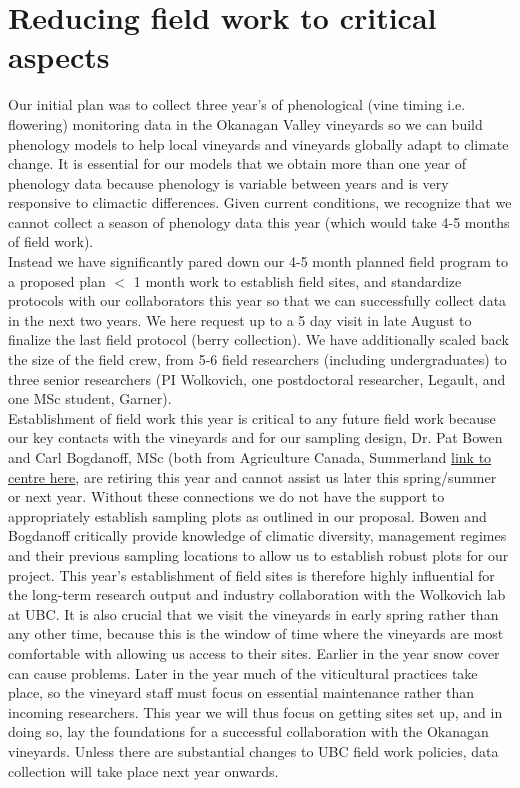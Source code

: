 \documentclass[11pt,letter]{article}
\begin{document}
\section{Reducing field work to critical aspects}
Our initial plan was to collect three year's of phenological (vine timing i.e. flowering) monitoring data in the Okanagan Valley vineyards so we can build phenology models to help local vineyards and vineyards globally adapt to climate change. It is essential for our models that we obtain more than one year of phenology data because phenology is variable between years and is very responsive to climactic differences. Given current conditions, we recognize that we cannot collect a season of phenology data this year (which would take 4-5 months of field work).\\ 

Instead we have significantly pared down our 4-5 month planned field program to a proposed plan $<$ 1 month work to establish field sites, and standardize protocols with our collaborators this year so that we can successfully collect data in the next two years. We here request up to a 5 day visit in late August to finalize the last field protocol (berry collection). We have additionally scaled back the size of the field crew, from 5-6 field researchers (including undergraduates) to three senior researchers (PI Wolkovich, one postdoctoral researcher, Legault, and one MSc student, Garner).\\

Establishment of field work this year is critical to any future field work because our key contacts with the vineyards and for our sampling design, Dr. Pat Bowen and Carl Bogdanoff, MSc (both from Agriculture Canada, Summerland \href{https://profils-profiles.science.gc.ca/en/research-centre/summerland-research-and-development-centre}{link to centre here}, are retiring this year and cannot assist us later this spring/summer or next year. Without these connections we do not have the support to appropriately establish sampling plots as outlined in our proposal. Bowen and Bogdanoff critically provide knowledge of climatic diversity, management regimes and their previous sampling locations to allow us to establish robust plots for our project. This year's establishment of field sites is therefore highly influential for the long-term research output and industry collaboration with the Wolkovich lab at UBC. It is also crucial that we visit the vineyards in early spring rather than any other time, because this is the window of time where the vineyards are most comfortable with allowing us access to their sites. Earlier in the year snow cover can cause problems. Later in the year much of the viticultural practices take place, so the vineyard staff must focus on essential maintenance rather than incoming researchers. This year we will thus focus on getting sites set up, and in doing so, lay the foundations for a successful collaboration with the Okanagan vineyards. Unless there are substantial changes to UBC field work policies, data collection will take place next year onwards.
\end{document}
